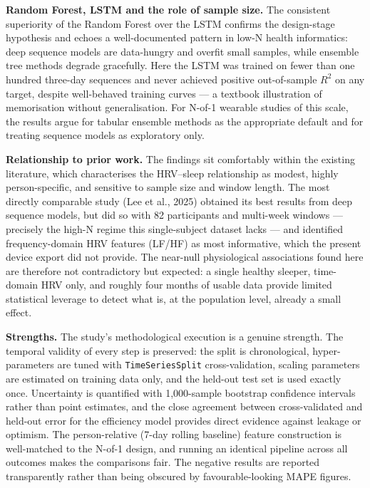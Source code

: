 \documentclass[fleqn,10pt]{wlscirep}
\begin{document}
\noindent\textbf{Random Forest, LSTM and the role of sample size.} The consistent superiority of the Random Forest over the LSTM confirms the design-stage hypothesis and echoes a well-documented pattern in low-N health informatics: deep sequence models are data-hungry and overfit small samples, while ensemble tree methods degrade gracefully. Here the LSTM was trained on fewer than one hundred three-day sequences and never achieved positive out-of-sample $R^2$ on any target, despite well-behaved training curves --- a textbook illustration of memorisation without generalisation. For N-of-1 wearable studies of this scale, the results argue for tabular ensemble methods as the appropriate default and for treating sequence models as exploratory only.

\noindent\textbf{Relationship to prior work.} The findings sit comfortably within the existing literature, which characterises the HRV--sleep relationship as modest, highly person-specific, and sensitive to sample size and window length. The most directly comparable study (Lee et al., 2025) obtained its best results from deep sequence models, but did so with 82 participants and multi-week windows --- precisely the high-N regime this single-subject dataset lacks --- and identified frequency-domain HRV features (LF/HF) as most informative, which the present device export did not provide. The near-null physiological associations found here are therefore not contradictory but expected: a single healthy sleeper, time-domain HRV only, and roughly four months of usable data provide limited statistical leverage to detect what is, at the population level, already a small effect.

\noindent\textbf{Strengths.} The study's methodological execution is a genuine strength. The temporal validity of every step is preserved: the split is chronological, hyper-parameters are tuned with \texttt{TimeSeriesSplit} cross-validation, scaling parameters are estimated on training data only, and the held-out test set is used exactly once. Uncertainty is quantified with 1{,}000-sample bootstrap confidence intervals rather than point estimates, and the close agreement between cross-validated and held-out error for the efficiency model provides direct evidence against leakage or optimism. The person-relative (7-day rolling baseline) feature construction is well-matched to the N-of-1 design, and running an identical pipeline across all outcomes makes the comparisons fair. The negative results are reported transparently rather than being obscured by favourable-looking MAPE figures.
\end{document}
